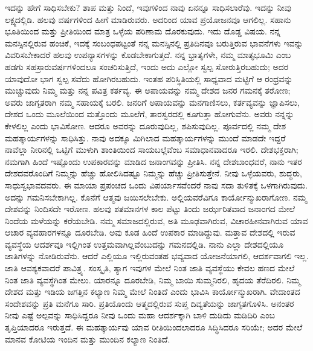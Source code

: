 ಇದನ್ನು ಹೇಗೆ ಸಾಧಿಸಬೇಕು? ಶಾಪ ಮತ್ತು ನಿಂದೆ, ಇವುಗಳಿಂದ ನಾವು ಏನನ್ನೂ ಸಾಧಿಸಲಾರೆವು. ಇದನ್ನು ನೀವು ಲಕ್ಷ್ಯದಲ್ಲಿಡಿ. ಹಲವು ವರ್ಷಗಳಿಂದ ಹೀಗೆ ಮಾಡಿರುವರು. ಅದರಿಂದ ಯಾವ ಪ್ರಯೋಜನವೂ ಆಗಲಿಲ್ಲ. ಸಹಾನು ಭೂತಿಯಿಂದ ಮತ್ತು ಪ್ರೀತಿಯಿಂದ ಮಾತ್ರ ಒಳ್ಳೆಯ ಪರಿಣಾಮ ದೊರಕುವುದು. ಇದು ದೊಡ್ಡ ವಿಷಯ. ನನ್ನ ಮನಸ್ಸಿನಲ್ಲಿರುವ ಹಂಚಿಕೆ, ಇದಕ್ಕೆ ಸಂಬಂಧಪಟ್ಟಂತೆ ನನ್ನ ಮನಸ್ಸಿನಲ್ಲಿ ಪ್ರತಿದಿನವೂ ಬರುತ್ತಿರುವ ಭಾವನೆಗಳು ಇವನ್ನು ವಿವರಿಸಬೇಕಾದರೆ ಹಲವು ಉಪನ್ಯಾಸಗಳನ್ನು ಕೊಡಬೇಕಾಗುತ್ತದೆ. ನನ್ನ ಭ್ರಾತೃಗಳೇ, ನಮ್ಮ ಮಾತೃಭೂಮಿ ಎಂಬ ಹಡಗು ಸಹಸ್ರಾರು\break ವರ್ಷಗಳಿಂದಲೂ ಸಂಚರಿಸುತ್ತಿದೆ, ಇಂದು ಅದು ಎಲ್ಲೋ ಸ್ವಲ್ಪ ಸೋರುತ್ತಿರಬಹುದು; ಅದರ ಯಾವುದೋ ಭಾಗ ಸ್ವಲ್ಪ ಸವೆದು ಹೋಗಿರಬಹುದು. ಇಂತಹ ಪರಿಸ್ಥಿತಿಯಲ್ಲಿ ಸಾಧ್ಯವಾದ ಮಟ್ಟಿಗೆ ಆ ರಂಧ್ರವನ್ನು ಮುಚ್ಚುವುದು ನಿಮ್ಮ ಮತ್ತು ನನ್ನ ಪವಿತ್ರ ಕರ್ತವ್ಯ. ಈ ಅಪಾಯವನ್ನು ನಮ್ಮ ದೇಶದ ಜನರ ಗಮನಕ್ಕೆ ತರೋಣ; ಅವರು ಜಾಗೃತರಾಗಿ ನಮ್ಮ ಸಹಾಯಕ್ಕೆ ಬರಲಿ. ಜನರಿಗೆ ಅಪಾಯವನ್ನು ಮನಗಾಣಿಸಲು, ಕರ್ತವ್ಯವನ್ನು ಜ್ಞಾಪಿಸಲು, ದೇಶದ ಒಂದು ಮೂಲೆಯಿಂದ ಮತ್ತೊಂದು ಮೂಲೆಗೆ, ತಾರಸ್ವರದಲ್ಲಿ ಕೂಗುತ್ತಾ ಹೋಗುವೆನು. ಅವರು ನನ್ನನ್ನು ಕೇಳಲಿಲ್ಲ ಎಂದು ಭಾವಿಸೋಣ. ಆದರೂ ಅವರನ್ನು ದೂರುವುದಿಲ್ಲ, ಶಪಿಸುವುದಿಲ್ಲ. ಪೂರ್ವದಲ್ಲಿ ನಮ್ಮ ದೇಶ ಮಹತ್ಕಾರ್ಯಗಳನ್ನು ಸಾಧಿಸಿತ್ತು. ನಾವು ಅದಕ್ಕೂ ಮಿಗಿಲಾದ ಮಹತ್ಕಾರ್ಯಗಳನ್ನು ಮುಂದೆ ಮಾಡದೇ ಇದ್ದರೆ ನಾವೆಲ್ಲಾ ನೀರಿನಲ್ಲಿ ಒಟ್ಟಿಗೆ ಮುಳುಗಿ ಶಾಂತಿಯಿಂದ ಸಾಯಬಲ್ಲೆವೆಂಬ ಸಮಾಧಾನವಾದರೂ ಇರಲಿ. ದೇಶಭಕ್ತರಾಗಿ; ನಮಗಾಗಿ ಹಿಂದೆ ಇಷ್ಟೊಂದು ಉಪಕಾರವನ್ನು ಮಾಡಿದ ಜನಾಂಗವನ್ನು ಪ್ರೀತಿಸಿ. ನನ್ನ ದೇಶಬಾಂಧವರೆ, ನಾನು ಇತರ ದೇಶದವರೊಂದಿಗೆ ನಿಮ್ಮನ್ನು ಹೆಚ್ಚು ಹೋಲಿಸಿದಷ್ಟೂ ನಿಮ್ಮನ್ನು ಹೆಚ್ಚು ಪ್ರೀತಿಸುತ್ತೇನೆ. ನೀವು ಒಳ್ಳೆಯವರು, ಶುದ್ಧರು, ಸಾಧುಸ್ವಭಾವದವರು. ಈ ಮಾಯಾ ಪ್ರಪಂಚದ ಒಂದು ವಿಪರ್ಯಾಸವೆಂದರೆ ನಾವು ಸದಾ ತುಳಿತಕ್ಕೆ ಒಳಗಾಗಿರುವುದು. ಅದನ್ನು ಗಮನಿಸಬೇಕಾಗಿಲ್ಲ. ಕೊನೆಗೆ ಆತ್ಮವು ಜಯಿಸಲೇಬೇಕು. ಅಲ್ಲಿಯವರೆವಿಗೂ ಕಾರ್ಯೋನ್ಮುಖರಾಗೋಣ. ನಮ್ಮ ದೇಶವನ್ನು ನಿಂದಿಸದೇ ಇರೋಣ. ಹಲವು ಶತಮಾನಗಳ ಕಾಲ ಪೆಟ್ಟು ತಿಂದು ಜರ್ಝರಿತವಾದ ಜನಾಂಗದ ಮೇಲೆ ನಿಂದೆಯ ಮಳೆಯನ್ನು ಕರೆಯಬೇಡಿ. ನಮ್ಮ ಸಮಾಜದಲ್ಲಿರುವ, ಅತಿ ಮೂಢವಾಗಿರುವ, ವಿಚಾರಹೀನವಾಗಿರುವ ಯಾವ ಆಚಾರ ವ್ಯವಹಾರಗಳನ್ನೂ ದೂರಬೇಡಿ. ಅವು ಕೂಡ ಹಿಂದೆ ಉಪಕಾರ ಮಾಡಿದ್ದುವು. ಮತ್ತಾವ ದೇಶದಲ್ಲಿ ಇರುವ ವ್ಯವಸ್ಥೆಯ ಆದರ್ಶವೂ ಇಲ್ಲಿಗಿಂತ ಉತ್ತಮವಾಗಿಲ್ಲವೆಂಬುದನ್ನು ಗಮನದಲ್ಲಿಡಿ. ನಾನು ಎಲ್ಲಾ ದೇಶದಲ್ಲಿಯೂ ಜಾತಿಗಳನ್ನು ನೋಡಿರುವೆನು. ಆದರೆ ಎಲ್ಲಿಯೂ ಇಲ್ಲಿರುವಂತಹ ಭವ್ಯವಾದ ಯೋಜನೆಯಾಗಲಿ, ಆದರ್ಶವಾಗಲಿ ಇಲ್ಲ. ಜಾತಿ ಆವಶ್ಯಕವಾದರೆ ಪಾವಿತ್ರ್ಯ. ಸಂಸ್ಕೃತಿ, ತ್ಯಾಗ ಇವುಗಳ ಮೇಲೆ ನಿಂತ ಜಾತಿ ವ್ಯವಸ್ಥೆಯು ಕೇವಲ ಹಣದ ಮೇಲೆ ನಿಂತ ಜಾತಿ ವ್ಯವಸ್ಥೆಗಿಂತ ಮೇಲು. ಯಾರನ್ನೂ ದೂರಬೇಡಿ, ನಿಮ್ಮ ಬಾಯಿ ಸುಮ್ಮನಿರಲಿ, ಹೃದಯ ತೆರೆದಿರಲಿ. ನಿಮ್ಮ ದೇಶದ ಮತ್ತು ಇಡಿಯ ಜಗತ್ತಿನ ಕಲ್ಯಾಣ ನಿಮ್ಮ ಮೇಲೆ ನಿಂತಿದೆ ಎಂದು ಭಾವಿಸಿ ಕಾರ್ಯೋನ್ಮುಖರಾಗಿ. ವೇದಾಂತದ ಸಂದೇಶವನ್ನು ಪ್ರತಿ ಮನೆಗೂ ಸಾರಿ. ಪ್ರತಿಯೊಂದು ಆತ್ಮದಲ್ಲಿರುವ ಸುಪ್ತ ದಿವ್ಯತೆಯನ್ನು ಜಾಗೃತಗೊಳಿಸಿ. ಅನಂತರ ನೀವು ಎಷ್ಟೆ ಅಲ್ಪವನ್ನು ಸಾಧಿಸಿದ್ದರೂ ನೀವು ಒಂದು ಮಹಾ ಆದರ್ಶಕ್ಕಾಗಿ ಬಾಳಿ ದುಡಿದು ಮಡಿದಿರಿ ಎಂಬ ತೃಪ್ತಿಯಾದರೂ ಇರುತ್ತದೆ. ಈ ಮಹತ್ಕಾರ್ಯವು ಯಾವ ರೀತಿಯಿಂದಲಾದರೂ ಸಿದ್ಧಿಸಿದರೂ ಸರಿಯೇ; ಅದರ ಮೇಲೆ ಮಾನವ ಕೋಟಿಯ ಇಂದಿನ ಮತ್ತು ಮುಂದಿನ ಕಲ್ಯಾಣ ನಿಂತಿದೆ.

